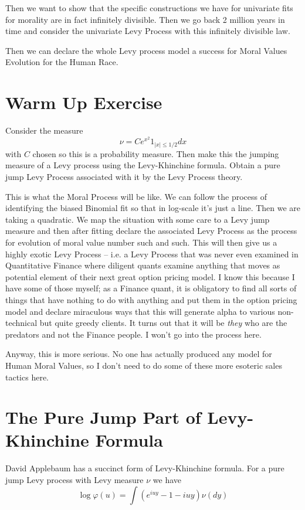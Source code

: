 \documentclass{amsart}
\begin{document}
Then we want to show that the specific constructions we have for univariate fits for morality are in fact infinitely divisible.  Then we go back 2 million years in time and consider the univariate Levy Process with this infinitely divisible law. 

Then we can declare the whole Levy process model a success for Moral Values Evolution for the Human Race.

\section{Warm Up Exercise}

Consider the measure 
\[
\nu = C e^{x^2} 1_{|x| \le 1/2} dx
\]
with $C$ chosen so this is a probability measure.  Then make this the jumping measure of a Levy process using the Levy-Khinchine formula.  Obtain a pure jump Levy Process associated with it by the Levy Process theory.  

This is what the Moral Process will be like.  We can follow the process of identifying the biased Binomial fit so that in log-scale it's just a line.  Then we are taking a quadratic.  We map the situation with some care to a Levy jump measure and then after fitting declare the associated Levy Process as the process for evolution of moral value number such and such.  This will then give us a highly exotic Levy Process -- i.e. a Levy Process that was never even examined in Quantitative Finance where diligent quants examine anything that moves as potential element of their next great option pricing model.  I know this because I have some of those myself; as a Finance quant, it is obligatory to find all sorts of things that have nothing to do with anything and put them in the option pricing model and declare miraculous ways that this will generate alpha to various non-technical but quite greedy clients.  It turns out that it will be {\em they} who are the predators and not the Finance people.  I won't go into the process here.

Anyway, this is more serious.  No one has actually produced any model for Human Moral Values, so I don't need to do some of these more esoteric sales tactics here.

\section{The Pure Jump Part of Levy-Khinchine Formula}

David Applebaum has a succinct form of Levy-Khinchine formula.  For a pure jump Levy process with Levy measure $\nu$ we have
\[
\log \varphi(u) = \int (e^{i u y} - 1 - i uy) \nu(dy)
\]
\end{document}
